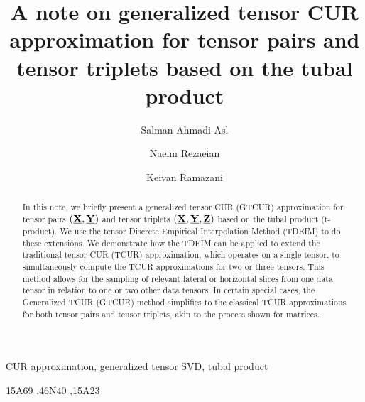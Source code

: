 \documentclass[preprint,12pt]{elsarticle}
\theoremstyle{definition}
\newcommand{\cX}{\underline{\bf X}}
\newcommand{\cY}{\underline{\bf Y}}
\newcommand{\cZ}{\underline{\bf Z}}
\begin{document}
\begin{frontmatter}

\title{A note on generalized tensor CUR approximation for tensor pairs and tensor triplets based on the tubal product}

 \author[label1]{Salman Ahmadi-Asl}
\author[label2]{Naeim Rezaeian}

\author[label3]{Keivan Ramazani}

\begin{abstract}
In this note, we briefly present a generalized tensor CUR (GTCUR) approximation for tensor pairs $(\cX,\cY)$ and tensor triplets $(\cX,\cY,\cZ)$ based on the tubal product (t-product). 
We use the tensor Discrete Empirical Interpolation Method (TDEIM) to do these extensions. We demonstrate how the TDEIM can be applied to extend the traditional tensor CUR (TCUR) approximation, which operates on a single tensor, to simultaneously compute the TCUR approximations for two or three tensors. This method allows for the sampling of relevant  lateral or horizontal slices from one data tensor in relation to one or two other data tensors. In certain special cases, the Generalized TCUR (GTCUR) method simplifies to the classical TCUR approximations for both tensor pairs and tensor triplets, akin to the process shown for matrices.
\end{abstract}
\begin{keyword}
CUR approximation, generalized tensor SVD, tubal product

\MSC 15A69 \sep 46N40 \sep 15A23
\end{keyword}

\end{frontmatter}
\end{document}
